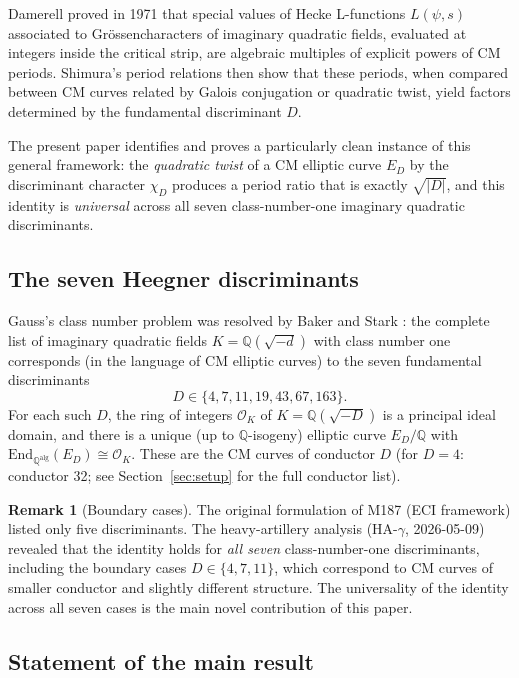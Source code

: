 \documentclass[12pt,a4paper]{article}
\theoremstyle{plain}
\theoremstyle{definition}
\newtheorem{remark}[theorem]{Remark}
\newcommand{\Q}{\mathbb{Q}}
\newcommand{\OK}{\mathcal{O}_K}
\newcommand{\End}{\mathrm{End}}
\begin{document}
Damerell \cite{Damerell1971a,Damerell1971b} proved in 1971 that
special values of Hecke L-functions $L(\psi, s)$ associated to Gr\"ossencharacters
of imaginary quadratic fields, evaluated at integers inside the critical strip,
are algebraic multiples of explicit powers of CM periods.  Shimura's period
relations \cite{Shimura1971} then show that these periods, when
compared between CM curves related by Galois conjugation or quadratic twist,
yield factors determined by the fundamental discriminant $D$.

The present paper identifies and proves a particularly clean instance of this
general framework: the \emph{quadratic twist} of a CM elliptic curve $E_D$ by
the discriminant character $\chi_D$ produces a period ratio that is exactly
$\sqrt{|D|}$, and this identity is \emph{universal} across all seven
class-number-one imaginary quadratic discriminants.

\subsection{The seven Heegner discriminants}

Gauss's class number problem was resolved by Baker \cite{Baker1966}
and Stark \cite{Stark1967}: the complete list of imaginary
quadratic fields $K = \Q(\sqrt{-d})$ with class number one corresponds (in
the language of CM elliptic curves) to the seven fundamental discriminants
\[
  D \in \{4, 7, 11, 19, 43, 67, 163\}.
\]
For each such $D$, the ring of integers $\OK$ of $K = \Q(\sqrt{-D})$ is a
principal ideal domain, and there is a unique (up to $\Q$-isogeny) elliptic
curve $E_D/\Q$ with $\End_{\Q^{\mathrm{alg}}}(E_D) \cong \OK$.  These are
the CM curves of conductor $D$ (for $D = 4$: conductor 32; see
Section~\ref{sec:setup} for the full conductor list).

\begin{remark}[Boundary cases]
The original formulation of M187 (ECI framework) listed only five discriminants.
The heavy-artillery analysis (HA-$\gamma$, 2026-05-09) revealed that the
identity holds for \emph{all seven} class-number-one discriminants, including
the boundary cases $D \in \{4, 7, 11\}$, which correspond to CM curves of
smaller conductor and slightly different structure.  The universality of the
identity across all seven cases is the main novel contribution of this paper.
\end{remark}

\subsection{Statement of the main result}
\end{document}
